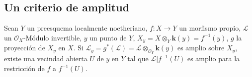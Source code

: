 
\subsection{Un criterio de amplitud}

\begin{theorem}[4.7.1]
\label{III.4.7.1-fr}
Sean $Y$ un preesquema localmente noetheriano, $f:X\to Y$ un morfismo
propio, $\mathcal L$ un $\mathcal O_X$-Módulo invertible, $y$ un punto de
$Y$, $X_y=X\otimes_Y\boldsymbol{k}(y)=f^{-1}(y)$, $g$ la proyección de $X_y$ en $X$.
Si $\mathcal L_y=g^*(\mathcal L)=\mathcal L\otimes_{\mathcal O_Y}\boldsymbol{k}(y)$ es
amplio sobre $X_y$, existe una vecindad abierta $U$ de $y$ en $Y$ tal que
$\mathcal L|f^{-1}(U)$ es amplio para la restricción de $f$ a $f^{-1}(U)$.
\end{theorem}

